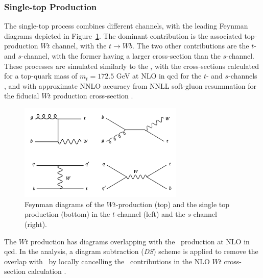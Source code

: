 \subsubsection{Single-top Production}
The single-top process combines different channels, with the leading Feynman diagrams depicted in Figure~\ref{fig:feynstop}. The dominant contribution is the associated top-production $Wt$ channel, with the $t \rightarrow Wb$. The two other contributions are the $t$- and $s$-channel, with the former having a larger cross-section than the $s$-channel. These processes are simulated similarly to the \ttb, with the cross-sections calculated for a top-quark mass of $m_t = 172.5$ GeV at NLO in \gls{qcd} for the $t$- and $s$-channels \cite{ALIEV20111034, KANT201574}, and with approximate NNLO accuracy from NNLL soft-gluon resummation for the fiducial $Wt$ production cross-section \cite{PhysRevD.82.054018, kidonakis2013quark}.
\begin{figure}[h!]
  \center
  \includegraphics[width=0.7\textwidth]{Images/VH/Feynman/singletop.png}
  \caption{Feynman diagrams of the $Wt$-production (top) and the single top production (bottom) in the $t$-channel (left) and the $s$-channel (right).} 
  \label{fig:feynstop}
\end{figure}

The $Wt$ production has diagrams overlapping with the \ttb\ production at NLO in \gls{qcd}. In the analysis, a diagram subtraction (\textit{DS}) scheme is applied to remove the overlap with \ttb\ by locally cancelling the \ttb\ contributions in the NLO $Wt$ cross-section calculation \cite{StefanoFrixione_2008}. 

